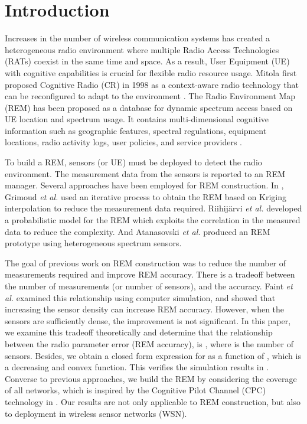 \documentclass[conference]{IEEEtran}
\begin{document}
\IEEEpeerreviewmaketitle

\section{Introduction}


Increases in the number of wireless communication systems has created a heterogeneous radio environment
where multiple Radio Access Technologies (RATs) coexist in the same time and space.
As a result, User Equipment (UE) with cognitive capabilities is crucial for flexible radio resource usage.
Mitola first proposed Cognitive Radio (CR) in 1998 as a context-aware radio technology that can be reconfigured to adapt to the environment \cite{CR_Mitola}.
The Radio Environment Map (REM) has been proposed as a database for dynamic spectrum access based on UE location and spectrum usage.
It contains multi-dimensional cognitive information such as geographic features, spectral regulations, equipment locations, radio activity logs,
user policies, and service providers \cite{CR_Performance_Evaluation}.

To build a REM, sensors (or UE) must be deployed to detect the radio environment.
The measurement data from the sensors is reported to an REM manager.
Several approaches have been employed for REM construction.
In \cite{REM_Fast_Algorithm}, Grimoud \emph{et al.} used an iterative process to obtain the REM based on Kriging interpolation
to reduce the measurement data required.
Riihij\"{a}rvi \emph{et al.} \cite{REM_spatial_statistics} developed a probabilistic model for the REM which
exploits the correlation in the measured data to reduce the complexity.
And Atanasovski \emph{et al.} \cite{REM_Heterogeneous_sensor} produced an REM prototype using heterogeneous spectrum sensors.

The goal of previous work on REM construction was to reduce the number of measurements required and improve REM accuracy.
There is a tradeoff between the number of measurements (or number of sensors), and the accuracy.
Faint \emph{et al.} \cite{REM_number_sensor_and_REM} examined this relationship using computer simulation,
and showed that increasing the sensor density can increase REM accuracy.
However, when the sensors are sufficiently dense, the improvement is not significant.
In this paper, we examine this tradeoff theoretically and determine that the relationship between the radio parameter error (REM accuracy),
is , where  is the number of sensors.
Besides, we obtain a closed form expression for  as a function of , which is a decreasing and convex function.
This verifies the simulation results in \cite{REM_number_sensor_and_REM}.
Converse to previous approaches, we build the REM by considering the coverage of all networks,
which is inspired by the Cognitive Pilot Channel (CPC) technology in \cite{CPC_Ondemand}.
Our results are not only applicable to REM construction, but also to deployment in wireless sensor networks (WSN).
\end{document}
